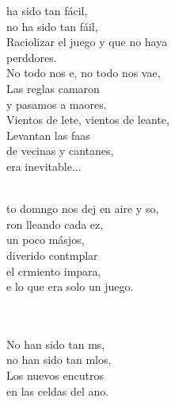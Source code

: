 \documentclass[12pt]{article}
\begin{document}
\begin{multicols*}{2}
        \begin{cancion}%
                ha sido tan fácil, \\
                no ha sido tan fáil,\\
                Raciolizar el juego y que no haya \\
                perddores.\\
        \jump
                No todo nos e, no todo nos vae,\\
                Las reglas camaron \\
                y pasamos a maores.\\
        \jump
                Vientos de lete, vientos de leante,\\
                Levantan las faas \\
                de vecinas y cantanes,\\
        era inevitable...\\\jump\\
                \begin{chorus}%
                to domngo nos dej en aire y so, \\
                ron lleando cada ez, \\
                un poco másjos,\\
                 diverido contmplar  \\
                el crmiento impara,\\
                e lo que era solo un juego.\\
                \end{chorus}%
                \jump\\
                   \\
                No han sido tan ms, \\
                no han sido tan mlos,\\
                Los nuevos encutros  \\
                en las celdas del ano.\\

\end{cancion}
\end{multicols*}
\end{document}
